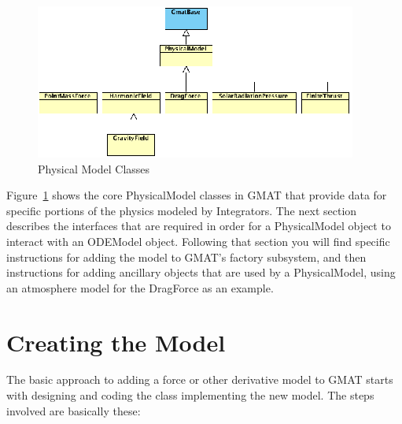 \documentclass[letterpaper,10pt]{article}
\begin{document}
\begin{figure}[htb]
\begin{centering}
\includegraphics[scale=2.5]{./AddPhysicalModelImages/PhysicalModels.eps}
\caption{Physical Model Classes}
\label{fig:PhysicalModels}
\end{centering}
\end{figure}

Figure~\ref{fig:PhysicalModels} shows the core PhysicalModel classes in GMAT
that provide data for specific portions of the physics modeled by Integrators. 
The next section describes the interfaces that are required in order for a
PhysicalModel object to interact with an ODEModel object.  Following that
section you will find specific instructions for adding the model to GMAT's
factory subsystem, and then instructions for adding ancillary objects that are
used by a PhysicalModel, using an atmosphere model for the DragForce as an
example.

\section{Creating the Model}

The basic approach to adding a force or other derivative model to GMAT starts
with designing and coding the class implementing the new model.  The steps
involved are basically these:
\end{document}
